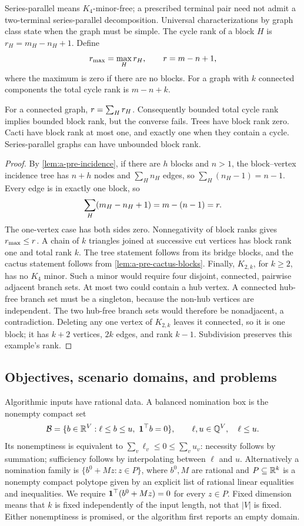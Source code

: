 Series-parallel means $K_4$-minor-free; a prescribed terminal pair
need not admit a two-terminal series-parallel decomposition. Universal
characterizations by graph class state when the graph must be simple.
The cycle rank of a block $H$ is $r_H=m_H-n_H+1$. Define
\[
 r_{\max}=\max_H r_H,\qquad r=m-n+1,
\]
where the maximum is zero if there are no blocks. For a graph with $k$
connected components the total cycle rank is $m-n+k$.

\begin{lemma}
\label{lem:a-pre-ranks}
For a connected graph, $r=\sum_H r_H$. Consequently bounded
total cycle rank implies bounded block rank, but the converse fails.
Trees have block rank zero. Cacti have block rank at most one, and
exactly one when they contain a cycle. Series-parallel graphs can have
unbounded block rank.
\end{lemma}
\begin{proof}
By \cref{lem:a-pre-incidence}, if there are $h$ blocks and $n>1$, the
block--vertex incidence tree has $n+h$ nodes and $\sum_H n_H$ edges,
so $\sum_H(n_H-1)=n-1$.
Every edge is in exactly one block, so
\[
 \sum_H(m_H-n_H+1)=m-(n-1)=r.
\]
The one-vertex case has both sides zero. Nonnegativity of block ranks
gives $r_{\max}\le r$. A chain of $k$ triangles joined at
successive cut vertices has block rank one and total rank $k$.
The tree statement follows from its bridge blocks, and the cactus
statement follows from \cref{lem:a-pre-cactus-blocks}. Finally,
$K_{2,k}$, for $k\ge2$, has no $K_4$ minor. Such a minor would require
four disjoint, connected, pairwise adjacent branch sets. At most two
could contain a hub vertex. A connected hub-free branch set must be
a singleton, because the non-hub vertices are independent. The two
hub-free branch sets would therefore be nonadjacent, a contradiction.
Deleting any one vertex of $K_{2,k}$ leaves it connected, so it is one
block; it has $k+2$ vertices, $2k$ edges, and rank $k-1$.
Subdivision preserves this example's rank.
\end{proof}

\subsection{Objectives, scenario domains, and problems}
\label{subsec:a-pre-objectives}
Algorithmic inputs have rational data. A balanced nomination box is the
nonempty compact set
\[
 \mathcal{B}=\{b\in\mathbb{R}^V:\ell\le b\le u,\ \mathbf{1}^\top b=0\},
 \qquad \ell,u\in\mathbb{Q}^V,\quad \ell\le u.
\]
Its nonemptiness is equivalent to $\sum_v\ell_v\le0\le\sum_vu_v$:
necessity follows by summation; sufficiency follows by interpolating
between $\ell$ and $u$. Alternatively a nomination family is
$\{b^0+Mz:z\in P\}$, where $b^0,M$ are rational and $P\subseteq\mathbb{R}^k$
is a nonempty compact polytope given by an explicit list of rational
linear equalities and inequalities. We require
$\mathbf{1}^\top(b^0+Mz)=0$ for every $z\in P$. Fixed dimension means that
$k$ is fixed independently of the input length, not that $|V|$ is fixed.
Either nonemptiness is promised, or the algorithm first reports an
empty domain.

